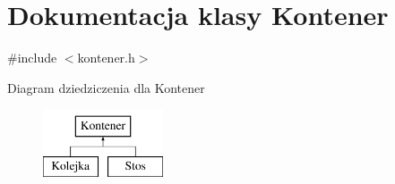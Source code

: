 \hypertarget{class_kontener}{\section{Dokumentacja klasy Kontener}
\label{class_kontener}
}


{\ttfamily \#include $<$kontener.\-h$>$}

Diagram dziedziczenia dla Kontener\begin{figure}[H]
\begin{center}
\leavevmode
\includegraphics[height=2.000000cm]{class_kontener}
\end{center}
\end{figure}
